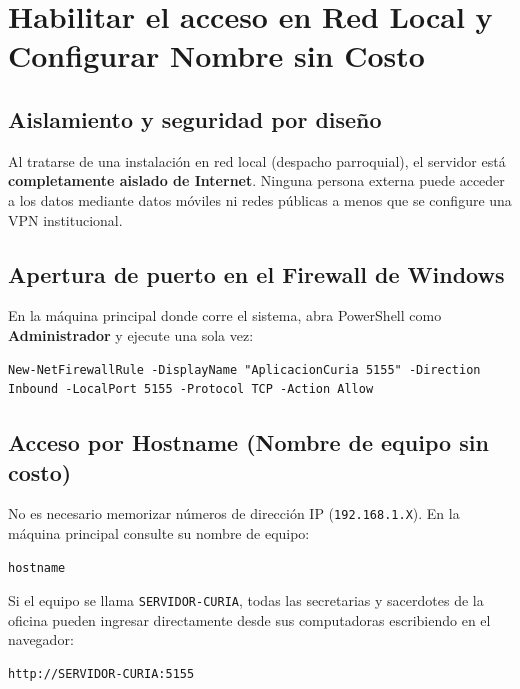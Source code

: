 \section{Habilitar el acceso en Red Local y Configurar Nombre sin Costo}

\subsection{Aislamiento y seguridad por diseño}
Al tratarse de una instalación en red local (despacho parroquial), el servidor está \textbf{completamente aislado de Internet}. Ninguna persona externa puede acceder a los datos mediante datos móviles ni redes públicas a menos que se configure una VPN institucional.

\subsection{Apertura de puerto en el Firewall de Windows}
En la máquina principal donde corre el sistema, abra PowerShell como \textbf{Administrador} y ejecute una sola vez:
\begin{lstlisting}[style=consola]
New-NetFirewallRule -DisplayName "AplicacionCuria 5155" -Direction Inbound -LocalPort 5155 -Protocol TCP -Action Allow
\end{lstlisting}

\subsection{Acceso por Hostname (Nombre de equipo sin costo)}
No es necesario memorizar números de dirección IP (\texttt{192.168.1.X}). En la máquina principal consulte su nombre de equipo:
\begin{lstlisting}[style=consola]
hostname
\end{lstlisting}
Si el equipo se llama \texttt{SERVIDOR-CURIA}, todas las secretarias y sacerdotes de la oficina pueden ingresar directamente desde sus computadoras escribiendo en el navegador:
\begin{lstlisting}[style=consola]
http://SERVIDOR-CURIA:5155
\end{lstlisting}

